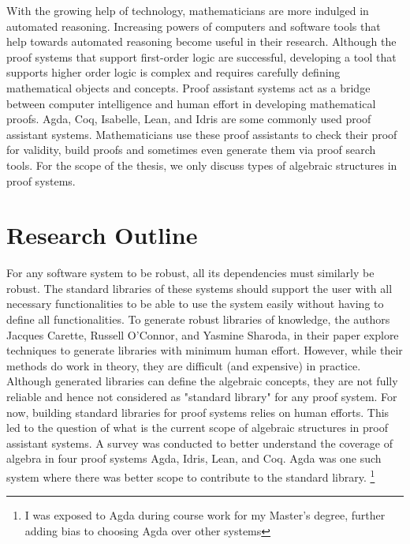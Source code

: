 With the growing help of technology, mathematicians are more indulged in
automated reasoning. Increasing powers of computers and software tools that help
towards automated reasoning become useful in their research. Although the proof
systems that support first-order logic are successful, developing a tool that
supports higher order logic is complex \cite{phillips2010automated} and requires
carefully defining mathematical objects and concepts. Proof assistant systems act
as a bridge between computer intelligence and human effort in developing
mathematical proofs. Agda, Coq, Isabelle, Lean, and Idris are some commonly used
proof assistant systems. Mathematicians use these proof assistants to check
their proof for validity, build proofs and sometimes even generate them via
proof search tools. For the scope of the thesis, we only discuss types of
algebraic structures in proof systems.

\section{Research Outline}
For any software system to be robust, all its dependencies must similarly be
robust. The standard libraries of these systems should support the user with all
necessary functionalities to be able to use the system easily without having to
define all functionalities. To generate robust libraries of knowledge, the
authors Jacques Carette, Russell O'Connor, and Yasmine Sharoda, in their paper
\cite{BuildingDiamond} explore techniques to generate libraries with minimum
human effort. However, while their methods do work in theory, they are difficult
(and expensive) in practice. Although generated libraries can define the
algebraic concepts, they are not fully reliable and hence not considered as
"standard library" for any proof system. For now, building standard libraries
for proof systems relies on human efforts. This led to the question of what is
the current scope of algebraic structures in proof assistant systems. A survey
was conducted to better understand the coverage of algebra in four proof systems
Agda, Idris, Lean, and Coq. Agda was one such system where there was better
scope to contribute to the standard library. \footnote{I was exposed to Agda
during course work for my Master's degree, further adding bias to choosing Agda
over other systems} 

